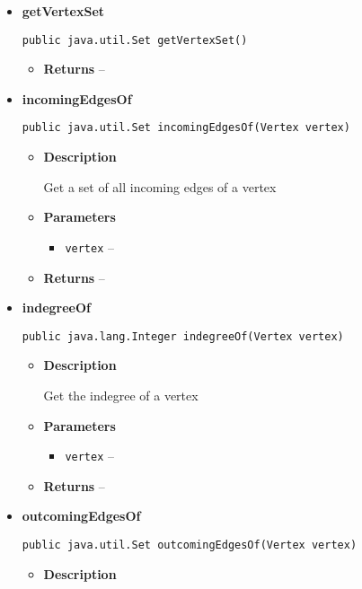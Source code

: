{{{{{{{{{{{{{\begin{itemize}
{\begin{itemize}
{}%
\end{itemize}
}%
\item{ 
{\bf  getVertexSet}\\
\begin{lstlisting}[frame=none]
public java.util.Set getVertexSet()\end{lstlisting} %
\begin{itemize}
\item{{\bf  Returns} -- 
 
}%
\end{itemize}
}%
\item{ 
{\bf  incomingEdgesOf}\\
\begin{lstlisting}[frame=none]
public java.util.Set incomingEdgesOf(Vertex vertex)\end{lstlisting} %
\begin{itemize}
\item{
{\bf  Description}

Get a set of all incoming edges of a vertex
}
\item{
{\bf  Parameters}
  \begin{itemize}
   \item{
\texttt{vertex} -- }
  \end{itemize}
}%
\item{{\bf  Returns} -- 
 
}%
\end{itemize}
}%
\item{ 
{\bf  indegreeOf}\\
\begin{lstlisting}[frame=none]
public java.lang.Integer indegreeOf(Vertex vertex)\end{lstlisting} %
\begin{itemize}
\item{
{\bf  Description}

Get the indegree of a vertex
}
\item{
{\bf  Parameters}
  \begin{itemize}
   \item{
\texttt{vertex} -- }
  \end{itemize}
}%
\item{{\bf  Returns} -- 
 
}%
\end{itemize}
}%
\item{ 
{\bf  outcomingEdgesOf}\\
\begin{lstlisting}[frame=none]
public java.util.Set outcomingEdgesOf(Vertex vertex)\end{lstlisting} %
\begin{itemize}
\item{
{\bf  Description}

}
\end{itemize}}
\end{itemize}}}}}}}}}}}}}}
